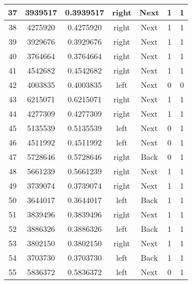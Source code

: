 \documentclass{jlreq}
\numberwithin{equation}{section}
\begin{document}
\begin{table}[H]
{\begin{tabular}{|c|c|c|c|c|c|c|}
      37           & 3939517          & 0.3939517      & right     & Next & 1     & 1   \\ \hline
      38           & 4275920          & 0.4275920      & right     & Next & 1     & 1   \\ \hline
      39           & 3929676          & 0.3929676      & right     & Next & 1     & 1   \\ \hline
      40           & 3764664          & 0.3764664      & right     & Next & 1     & 1   \\ \hline
      41           & 4542682          & 0.4542682      & right     & Next & 1     & 1   \\ \hline
      42           & 4003835          & 0.4003835      & left      & Next & 0     & 0   \\ \hline
      43           & 6215071          & 0.6215071      & right     & Next & 1     & 1   \\ \hline
      44           & 4277309          & 0.4277309      & right     & Next & 1     & 1   \\ \hline
      45           & 5135539          & 0.5135539      & left      & Next & 0     & 1   \\ \hline
      46           & 4511992          & 0.4511992      & left      & Next & 0     & 1   \\ \hline
      47           & 5728646          & 0.5728646      & right     & Back & 0     & 1   \\ \hline
      48           & 5661239          & 0.5661239      & right     & Next & 1     & 1   \\ \hline
      49           & 3739074          & 0.3739074      & right     & Next & 1     & 1   \\ \hline
      50           & 3644017          & 0.3644017      & left      & Back & 1     & 1   \\ \hline
      51           & 3839496          & 0.3839496      & right     & Next & 1     & 1   \\ \hline
      52           & 3886326          & 0.3886326      & left      & Back & 1     & 1   \\ \hline
      53           & 3802150          & 0.3802150      & right     & Next & 1     & 1   \\ \hline
      54           & 3703730          & 0.3703730      & left      & Back & 1     & 1   \\ \hline
      55           & 5836372          & 0.5836372      & left      & Next & 0     & 1   \\ \hline

\end{tabular}}
\end{table}
\end{document}

